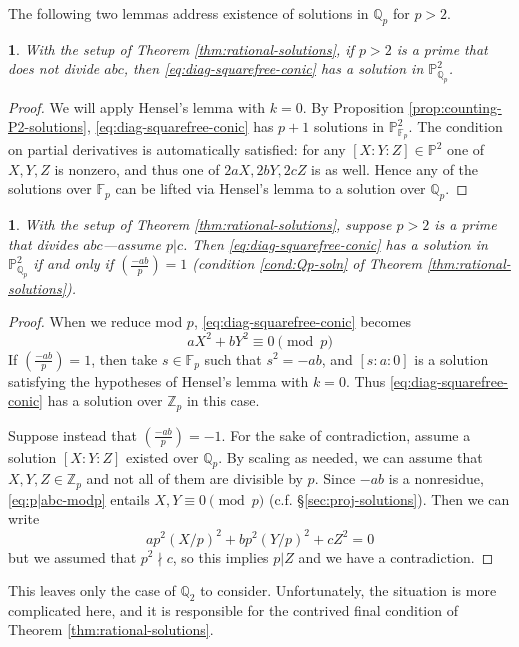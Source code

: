 \documentclass[10pt,a4paper]{amsart}
\numberwithin{equation}{section}
\numberwithin{figure}{section}
\numberwithin{table}{section}
\theoremstyle{definition}
\theoremstyle{plain}
\theoremstyle{remark}
\theoremstyle{plain}
\theoremstyle{definition}
\theoremstyle{plain}
\theoremstyle{plain}
\newtheorem{lem}[thm]{\protect\lemmaname}
\providecommand{\lemmaname}{Lemma}
\newcommand{\legendre}[2]{\genfrac{(}{)}{}{}{#1}{#2}}
\renewcommand{\P}{\mathbb{P}}
\newcommand{\F}{\mathbb{F}}
\newcommand{\Z}{\mathbb{Z}}
\newcommand{\Q}{\mathbb{Q}}
\newcommand{\ndiv}{\!\nmid\!}
\begin{document}
	The following two lemmas address existence of solutions in $\Q_p$ for $p>2$.
	\begin{lem}
		With the setup of Theorem \ref{thm:rational-solutions}, if $p > 2$ is a prime that does not divide $abc$, then \eqref{eq:diag-squarefree-conic} has a solution in $\P^2_{\Q_p}$.
	\end{lem}
	\begin{proof}
		We will apply Hensel's lemma with $k=0$. By Proposition \ref{prop:counting-P2-solutions}, \eqref{eq:diag-squarefree-conic} has $p+1$ solutions in $\P^2_{\F_p}$. The condition on partial derivatives is automatically satisfied: for any $[X:Y:Z]\in \P^2$ one of $X,Y,Z$ is nonzero, and thus one of $2aX, 2bY, 2cZ$ is as well. Hence any of the solutions over $\F_p$ can be lifted via Hensel's lemma to a solution over $\Q_p$.
	\end{proof}

	\begin{lem}
		With the setup of Theorem \ref{thm:rational-solutions}, suppose $p > 2$ is a prime that divides $abc$---assume $p|c$. Then \eqref{eq:diag-squarefree-conic} has a solution in $\P^2_{\Q_p}$ if and only if $\legendre{-ab}{p}=1$ (condition \eqref{cond:Qp-soln} of Theorem \ref{thm:rational-solutions}).
	\end{lem}
	\begin{proof}
		When we reduce mod $p$, \eqref{eq:diag-squarefree-conic} becomes
		\begin{equation}\label{eq:p|abc-modp}
			aX^2 + bY^2 \equiv 0 \pmod p
		\end{equation}
		If $\legendre{-ab}{p}=1$, then take $s\in \F_p$ such that $s^2 = -ab$, and $[s:a:0]$ is a solution satisfying the hypotheses of Hensel's lemma with $k=0$. Thus \eqref{eq:diag-squarefree-conic} has a solution over $\Z_p$ in this case.
		
		Suppose instead that $\legendre{-ab}{p}=-1$. For the sake of contradiction, assume a solution $[X:Y:Z]$ existed over $\Q_p$. By scaling as needed, we can assume that $X,Y,Z\in \Z_p$ and not all of them are divisible by $p$. Since $-ab$ is a nonresidue, \eqref{eq:p|abc-modp} entails $X,Y \equiv 0 \pmod p$ (c.f. \S\ref{sec:proj-solutions}). Then we can write
		\[
			ap^2 (X/p)^2 + bp^2 (Y/p)^2 + cZ^2 = 0
		\]
		but we assumed that $p^2\ndiv c$, so this implies $p|Z$ and we have a contradiction.
	\end{proof}
	This leaves only the case of $\Q_2$ to consider. Unfortunately, the situation is more complicated here, and it is responsible for the contrived final condition of Theorem \ref{thm:rational-solutions}.
	
\end{document}
